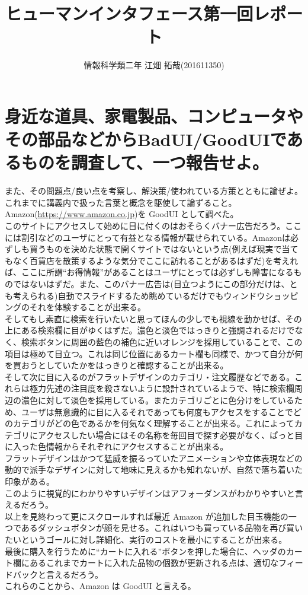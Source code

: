\documentclass{scrartcl}
\author{情報科学類二年 江畑 拓哉(201611350)}
\date{}
\title{ヒューマンインタフェース第一回レポート}
\begin{document}
\maketitle

\section{身近な道具、家電製品、コンピュータやその部品などからBadUI/GoodUIであるものを調査して、一つ報告せよ。}
\label{sec:org848d7db}
また、その問題点/良い点を考察し、解決策/使われている方策とともに論ぜよ。これまでに講義内で扱った言葉と概念を駆使して論ずること。\\

Amazon(\url{https://www.amazon.co.jp})を GoodUI として調べた。\\
このサイトにアクセスして始めに目に付くのはおそらくバナー広告だろう。ここには割引などのユーザにとって有益となる情報が載せられている。Amazonは必ずしも買うものを決めた状態で開くサイトではないという点(例えば現実で当てもなく百貨店を散策するような気分でここに訪れることがあるはずだ)を考えれば、ここに所謂``お得情報''があることはユーザにとっては必ずしも障害になるものではないはずだ。また、このバナー広告は(目立つようにこの部分だけは、とも考えられる)自動でスライドするため眺めているだけでもウィンドウショッピングのそれを体験することが出来る。\\
そしてもし素直に検索を行いたいと思ってほんの少しでも視線を動かせば、その上にある検索欄に目がゆくはずだ。濃色と淡色ではっきりと強調されるだけでなく、検索ボタンに周囲の藍色の補色に近いオレンジを採用していることで、この項目は極めて目立つ。これは同じ位置にあるカート欄も同様で、かつて自分が何を買おうとしていたかをはっきりと確認することが出来る。\\
そして次に目に入るのがフラットデザインのカテゴリ・注文履歴などである。これらは極力先述の注目度を殺さないように設計されているようで、特に検索欄周辺の濃色に対して淡色を採用している。またカテゴリごとに色分けをしているため、ユーザは無意識的に目に入るそれであっても何度もアクセスをすることでどのカテゴリがどの色であるかを何気なく理解することが出来る。これによってカテゴリにアクセスしたい場合にはその名称を毎回目で探す必要がなく、ぱっと目に入った色情報からそれぞれにアクセスすることが出来る。\\
フラットデザインはかつて猛威を振るっていたアニメーションや立体表現などの動的で派手なデザインに対して地味に見えるかも知れないが、自然で落ち着いた印象がある。\\
このように視覚的にわかりやすいデザインはアフォーダンスがわかりやすいと言えるだろう。\\
以上を見終わって更にスクロールすれば最近 Amazon が追加した目玉機能の一つであるダッシュボタンが顔を見せる。これはいつも買っている品物を再び買いたいというゴールに対し詳細化、実行のコストを最小にすることが出来る。\\
最後に購入を行うために``カートに入れる''ボタンを押した場合に、ヘッダのカート欄にあるこれまでカートに入れた品物の個数が更新される点は、適切なフィードバックと言えるだろう。\\
これらのことから、Amazon は GoodUI と言える。\\
\end{document}
